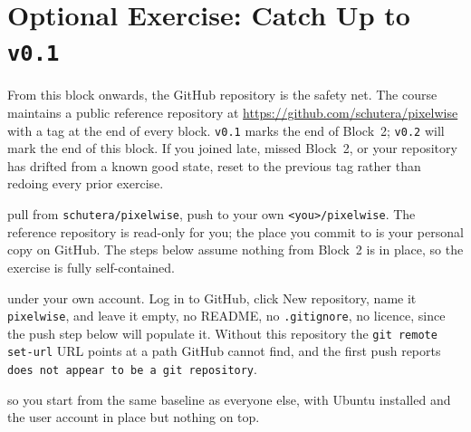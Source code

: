 





\newpage
\section{Optional Exercise: Catch Up to \texttt{v0.1}}

From this block onwards, the GitHub repository is the safety net.
The course maintains a public reference repository at
\url{https://github.com/schutera/pixelwise} with a tag at the end of every block.
\texttt{v0.1} marks the end of Block~2; \texttt{v0.2} will mark the end of
this block.
If you joined late, missed Block~2, or your repository has drifted from a
known good state, reset to the previous tag rather than redoing every prior
exercise.


 pull from \texttt{schutera/pixelwise}, push to your
own \texttt{<you>/pixelwise}. The reference repository is read-only for
you; the place you commit to is your personal copy on GitHub. The steps
below assume nothing from Block~2 is in place, so the exercise is fully
self-contained.

 under
your own account. Log in to GitHub, click New repository, name it
\texttt{pixelwise}, and leave it empty, no README, no \texttt{.gitignore},
no licence, since the push step below will populate it. Without this
repository the \texttt{git remote set-url} URL points at a path GitHub
cannot find, and the first push reports \texttt{does not appear to be a
git repository}.

 so you start from
the same baseline as everyone else, with Ubuntu installed and the user
account in place but nothing on top.

